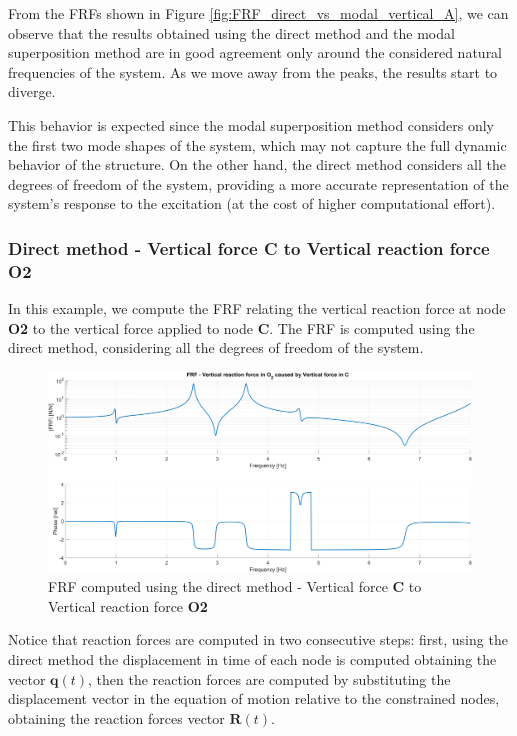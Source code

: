 From the FRFs shown in Figure \ref{fig:FRF_direct_vs_modal_vertical_A}, we can observe that the results obtained using the direct method and the modal superposition method are in good agreement only around the considered natural frequencies of the system.
As we move away from the peaks, the results start to diverge.

This behavior is expected since the modal superposition method considers only the first two mode shapes of the system, which may not capture the full dynamic behavior of the structure.
On the other hand, the direct method considers all the degrees of freedom of the system, providing a more accurate representation of the system's response to the excitation (at the cost of higher computational effort).


\subsubsection{Direct method - Vertical force \textbf{C} to Vertical reaction force \textbf{O2}}
\label{subsubsec:direct_method_vertical_force_C}

In this example, we compute the FRF relating the vertical reaction force at node \textbf{O2} to the vertical force applied to node \textbf{C}.
The FRF is computed using the direct method, considering all the degrees of freedom of the system.

\begin{figure}[H]
    \centering
    \includegraphics[width=\textwidth]{img/MATLAB/FRFs/Reaction_O2.png}
    \caption{FRF computed using the direct method - Vertical force \textbf{C} to Vertical reaction force \textbf{O2}}
    \label{fig:FRF_direct_vertical_C}
\end{figure}

Notice that reaction forces are computed in two consecutive steps: first, using the direct method the displacement in time of each node is computed obtaining the vector $\mathbf{q}(t)$, then the reaction forces are computed by substituting the displacement vector in the equation of motion relative to the constrained nodes, obtaining the reaction forces vector $\mathbf{R}(t)$.